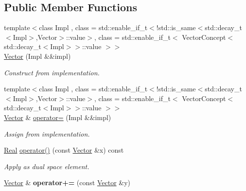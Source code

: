 \subsection*{Public Member Functions}
\begin{DoxyCompactItemize}
\item 
\hypertarget{classSpacy_1_1Vector_a1a31b17d62d98e2358a917821da8bf91}{}{\footnotesize template$<$class Impl , class  = std\+::enable\+\_\+if\+\_\+t$<$!std\+::is\+\_\+same$<$std\+::decay\+\_\+t$<$\+Impl$>$,\+Vector$>$\+::value$>$, class  = std\+::enable\+\_\+if\+\_\+t$<$ Vector\+Concept$<$std\+::decay\+\_\+t$<$\+Impl$>$$>$\+::value $>$$>$ }\\\hyperlink{classSpacy_1_1Vector_a1a31b17d62d98e2358a917821da8bf91}{Vector} (Impl \&\&impl)\label{classSpacy_1_1Vector_a1a31b17d62d98e2358a917821da8bf91}

\begin{DoxyCompactList}\small\item\em Construct from implementation. \end{DoxyCompactList}\item 
\hypertarget{classSpacy_1_1Vector_a253e3683c82828567c6ccd4bbfa5ded4}{}{\footnotesize template$<$class Impl , class  = std\+::enable\+\_\+if\+\_\+t$<$!std\+::is\+\_\+same$<$std\+::decay\+\_\+t$<$\+Impl$>$,\+Vector$>$\+::value$>$, class  = std\+::enable\+\_\+if\+\_\+t$<$ Vector\+Concept$<$std\+::decay\+\_\+t$<$\+Impl$>$$>$\+::value $>$$>$ }\\\hyperlink{classSpacy_1_1Vector}{Vector} \& \hyperlink{classSpacy_1_1Vector_a253e3683c82828567c6ccd4bbfa5ded4}{operator=} (Impl \&\&impl)\label{classSpacy_1_1Vector_a253e3683c82828567c6ccd4bbfa5ded4}

\begin{DoxyCompactList}\small\item\em Assign from implementation. \end{DoxyCompactList}\item 
\hypertarget{classSpacy_1_1Vector_af6f1ec896b05538a931e72dbecdebbb1}{}\hyperlink{classSpacy_1_1Real}{Real} \hyperlink{classSpacy_1_1Vector_af6f1ec896b05538a931e72dbecdebbb1}{operator()} (const \hyperlink{classSpacy_1_1Vector}{Vector} \&x) const \label{classSpacy_1_1Vector_af6f1ec896b05538a931e72dbecdebbb1}

\begin{DoxyCompactList}\small\item\em Apply as dual space element. \end{DoxyCompactList}\item 
\hypertarget{classSpacy_1_1Vector_a6d5770a3bd58db532e79b16f2526c275}{}\hyperlink{classSpacy_1_1Vector}{Vector} \& {\bfseries operator+=} (const \hyperlink{classSpacy_1_1Vector}{Vector} \&y)\label{classSpacy_1_1Vector_a6d5770a3bd58db532e79b16f2526c275}


\end{DoxyCompactItemize}
